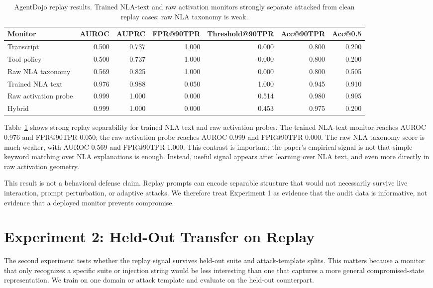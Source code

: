 \documentclass{article}
\begin{document}
\begin{table}[t]
\centering
\caption{AgentDojo replay results. Trained NLA-text and raw activation monitors strongly separate attacked from clean replay cases; raw NLA taxonomy is weak.}
\label{tab:agentdojo-replay}
\small
\begin{tabular}{lrrrrrr}
\toprule
Monitor & AUROC & AUPRC & FPR@90TPR & Threshold@90TPR & Acc@90TPR & Acc@0.5 \\
\midrule
Transcript & 0.500 & 0.737 & 1.000 & 0.000 & 0.800 & 0.200 \\
Tool policy & 0.500 & 0.737 & 1.000 & 0.000 & 0.800 & 0.200 \\
Raw NLA taxonomy & 0.569 & 0.825 & 1.000 & 0.000 & 0.800 & 0.505 \\
Trained NLA text & 0.976 & 0.988 & 0.050 & 1.000 & 0.945 & 0.910 \\
Raw activation probe & 0.999 & 1.000 & 0.000 & 0.514 & 0.980 & 0.995 \\
Hybrid & 0.999 & 1.000 & 0.000 & 0.453 & 0.975 & 0.200 \\
\bottomrule
\end{tabular}
\end{table}

Table~\ref{tab:agentdojo-replay} shows strong replay separability for trained NLA text and raw activation probes. The trained NLA-text monitor reaches AUROC 0.976 and FPR@90TPR 0.050; the raw activation probe reaches AUROC 0.999 and FPR@90TPR 0.000. The raw NLA taxonomy score is much weaker, with AUROC 0.569 and FPR@90TPR 1.000. This contrast is important: the paper's empirical signal is not that simple keyword matching over NLA explanations is enough. Instead, useful signal appears after learning over NLA text, and even more directly in raw activation geometry.

This result is not a behavioral defense claim. Replay prompts can encode separable structure that would not necessarily survive live interaction, prompt perturbation, or adaptive attacks. We therefore treat Experiment 1 as evidence that the audit data is informative, not evidence that a deployed monitor prevents compromise.

\section{Experiment 2: Held-Out Transfer on Replay}

The second experiment tests whether the replay signal survives held-out suite and attack-template splits. This matters because a monitor that only recognizes a specific suite or injection string would be less interesting than one that captures a more general compromised-state representation. We train on one domain or attack template and evaluate on the held-out counterpart.
\end{document}
